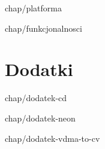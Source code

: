\documentclass[11pt]{aghdpl}
\author{Wojciech Gumuła}
\date{2017}
\begin{document}
\titlepages

{
	\fancyhf{}
	\renewcommand{\headrulewidth}{0pt}
	\renewcommand{\footrulewidth}{0pt}
}



\setcounter{tocdepth}{1}
\tableofcontents
\clearpage



 {chap/platforma}

 {chap/funkcjonalnosci}







\printbibliography

\appendix
\chapter*{Dodatki}
\renewcommand{\thesection}{\Alph{section}}

 {chap/dodatek-cd}

 {chap/dodatek-neon}

 {chap/dodatek-vdma-to-cv}
\end{document}
